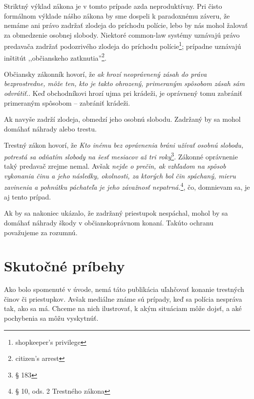 \documentclass[openany]{book}
\begin{document}
Striktný výklad zákona je v tomto prípade azda neproduktívny. Pri čisto formálnom výklade nášho zákona by sme dospeli k paradoxnému záveru, že nemáme ani právo zadržať zlodeja do príchodu polície, lebo by nás mohol žalovať za obmedzenie osobnej slobody. Niektoré common-law systémy uznávajú právo predavača zadržať podozrivého zlodeja do príchodu polície\footnote{shopkeeper's privilege}; prípadne uznávajú inštitút ,,občianskeho zatknutia''\footnote{citizen's arrest}.

Občiansky zákonník hovorí, že \emph{ak hrozí neoprávnený zásah do práva bezprostredne, môže ten, kto je takto ohrozený, primeraným spôsobom zásah sám odvrátiť.}. Keď obchodníkovi hrozí ujma pri krádeži, je oprávnený tomu zabrániť primeraným spôsobom -- zabrániť krádeži.

Ak navyše zadrží zlodeja, obmedzí jeho osobnú slobodu. Zadržaný by sa mohol domáhať náhrady alebo trestu. 


Trestný zákon hovorí, že \emph{Kto inému bez oprávnenia bráni užívať osobnú slobodu, potrestá sa odňatím slobody na šesť mesiacov až tri roky}\footnote{§ 183 }. Zákonné oprávnenie taký predavač zrejme nemal. Avšak \emph{nejde o prečin, ak vzhľadom na spôsob vykonania činu a jeho následky, okolnosti, za ktorých bol čin spáchaný, mieru zavinenia a pohnútku páchateľa je jeho závažnosť nepatrná.}\footnote{§ 10, ods. 2 Trestného zákona}, čo, domnievam sa, je aj tento prípad. 

Ak by sa nakoniec ukázalo, že zadržaný priestupok nespáchal, mohol by sa domáhať náhrady škody v občianskoprávnom konaní. Takúto ochranu považujeme za rozumnú.




\chapter{Skutočné príbehy}

Ako bolo spomenuté v úvode, nemá táto publikácia uľahčovať konanie trestných činov či priestupkov. Avšak mediálne známe sú prípady, keď sa polícia nespráva tak, ako sa má. Chceme na nich ilustrovať, k akým situáciam môže dojsť, a aké pochybenia sa môžu vyskytnúť.


\end{document}
